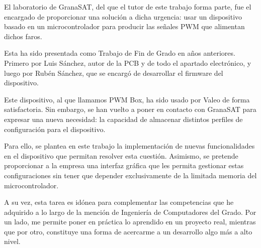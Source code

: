 El laboratorio de GranaSAT, del que el tutor de este trabajo forma parte, fue el encargado de proporcionar una solución a dicha urgencia: usar un dispositivo basado en un microcontrolador para producir las señales PWM que alimentan dichos faros.

Esta ha sido presentada como Trabajo de Fin de Grado en años anteriores. Primero por Luis Sánchez, autor de la PCB y de todo el apartado electrónico, y luego por Rubén Sánchez, que se encargó de desarrollar el firmware del dispositivo.

Este dispositivo, al que llamamos PWM Box, ha sido usado por Valeo de forma satisfactoria. Sin embargo, se han vuelto a poner en contacto con GranaSAT para expresar una nueva necesidad: la capacidad de almacenar distintos perfiles de configuración para el dispositivo.

Para ello, se plantea en este trabajo la implementación de nuevas funcionalidades en el dispositivo que permitan resolver esta cuestión. Asimismo, se pretende proporcionar a la empresa una interfaz gráfica que les permita gestionar estas configuraciones sin tener que depender exclusivamente de la limitada memoria del microcontrolador.

A su vez, esta tarea es idónea para complementar las competencias que he adquirido a lo largo de la mención de Ingeniería de Computadores del Grado. Por un lado, me permite poner en práctica lo aprendido en un proyecto real, mientras que por otro, constituye una forma de acercarme a un desarrollo algo más a alto nivel.


